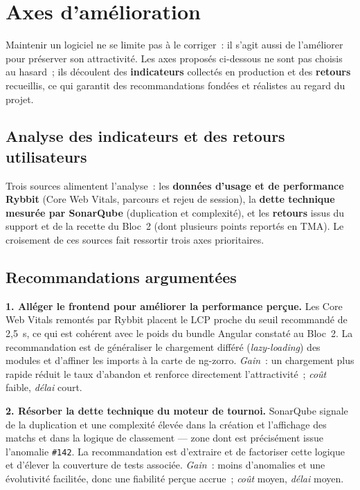 \section{Axes d'amélioration}
\label{sec:amelioration}

Maintenir un logiciel ne se limite pas à le corriger~: il s'agit aussi de l'améliorer pour préserver son attractivité. Les axes proposés ci-dessous ne sont pas choisis au hasard~; ils découlent des \textbf{indicateurs} collectés en production et des \textbf{retours} recueillis, ce qui garantit des recommandations fondées et réalistes au regard du projet.

\subsection{Analyse des indicateurs et des retours utilisateurs}
Trois sources alimentent l'analyse~: les \textbf{données d'usage et de performance Rybbit} (Core Web Vitals, parcours et rejeu de session), la \textbf{dette technique mesurée par SonarQube} (duplication et complexité), et les \textbf{retours} issus du support et de la recette du Bloc~2 (dont plusieurs points reportés en TMA). Le croisement de ces sources fait ressortir trois axes prioritaires.

\subsection{Recommandations argumentées}
\textbf{1. Alléger le frontend pour améliorer la performance perçue.} Les Core Web Vitals remontés par Rybbit placent le LCP proche du seuil recommandé de 2,5~s, ce qui est cohérent avec le poids du bundle Angular constaté au Bloc~2. La recommandation est de généraliser le chargement différé (\emph{lazy-loading}) des modules et d'affiner les imports à la carte de ng-zorro. \emph{Gain}~: un chargement plus rapide réduit le taux d'abandon et renforce directement l'attractivité~; \emph{coût} faible, \emph{délai} court.

\textbf{2. Résorber la dette technique du moteur de tournoi.} SonarQube signale de la duplication et une complexité élevée dans la création et l'affichage des matchs et dans la logique de classement — zone dont est précisément issue l'anomalie \texttt{\#142}. La recommandation est d'extraire et de factoriser cette logique et d'élever la couverture de tests associée. \emph{Gain}~: moins d'anomalies et une évolutivité facilitée, donc une fiabilité perçue accrue~; \emph{coût} moyen, \emph{délai} moyen.

